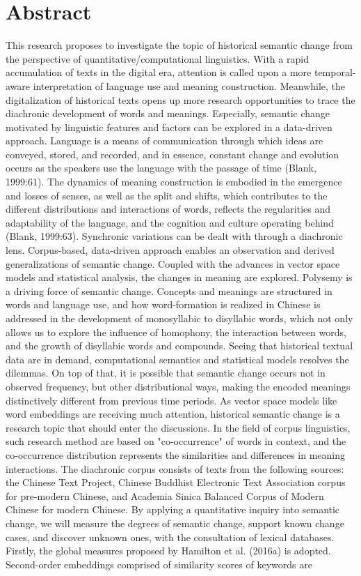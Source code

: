 

\chapter*{Abstract}
This research proposes to investigate the topic of historical semantic change from the perspective of quantitative/computational linguistics. With a rapid accumulation of texts in the digital era, attention is called upon a more temporal-aware interpretation of language use and meaning construction. Meanwhile, the digitalization of historical texts opens up more research opportunities to trace the diachronic development of words and meanings. Especially, semantic change motivated by linguistic features and factors can be explored in a data-driven approach. Language is a means of communication through which ideas are conveyed, stored, and recorded, and in essence, constant change and evolution occurs as the speakers use the language with the passage of time (Blank, 1999:61). The dynamics of meaning construction is embodied in the emergence and losses of senses, as well as the split and shifts, which contributes to the different distributions and interactions of words, reflects the regularities and adaptability of the language, and the cognition and culture operating behind (Blank, 1999:63). Synchronic variations can be dealt with through a diachronic lens. Corpus-based, data-driven approach enables an observation and derived generalizations of semantic change. Coupled with the advances in vector space models and statistical analysis, the changes in meaning are explored. Polysemy is a driving force of semantic change. Concepts and meanings are structured in words and language use, and how word-formation is realized in Chinese is addressed in the development of monosyllabic to disyllabic words, which not only allows us to explore the influence of homophony, the interaction between words, and the growth of disyllabic words and compounds. Seeing that historical textual data are in demand, computational semantics and statistical models resolves the dilemmas. On top of that, it is possible that semantic change occurs not in observed frequency, but other distributional ways, making the encoded meanings distinctively different from previous time periods. As vector space models like word embeddings are receiving much attention, historical semantic change is a research topic that should enter the discussions. In the field of corpus linguistics, such research method are based on "co-occurrence" of words in context, and the co-occurrence distribution represents the similarities and differences in meaning interactions. The diachronic corpus consists of texts from the following sources: the Chinese Text Project, Chinese Buddhist Electronic Text Association corpus for pre-modern Chinese, and Academia Sinica Balanced Corpus of Modern Chinese for modern Chinese. By applying a quantitative inquiry into semantic change, we will measure the degrees of semantic change, support known change cases, and discover unknown ones, with the consultation of lexical databases. Firstly, the global measures proposed by Hamilton et al. (2016a) is adopted. Second-order embeddings comprised of similarity scores of keywords are 